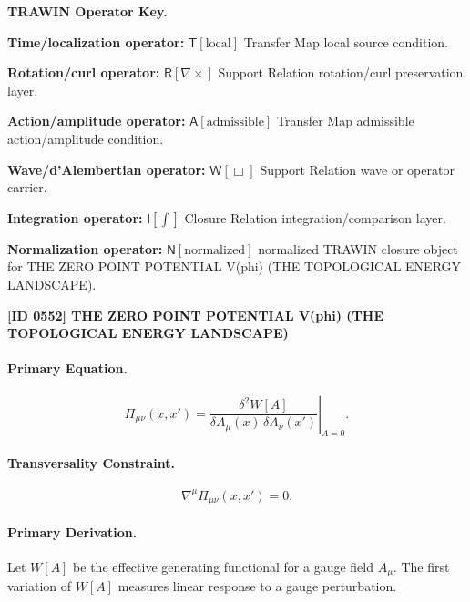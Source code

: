 \par\vspace{0.45\baselineskip}
\noindent\begin{minipage}[t]{\linewidth}
\begingroup
\small
\raggedright
\textbf{TRAWIN Operator Key.}\par
\noindent\textbf{Time/localization operator:} $\mathsf{T}\!\left[\mathrm{local}\right]$ Transfer Map local source condition.\par
\noindent\textbf{Rotation/curl operator:} $\mathsf{R}\!\left[\nabla\times\right]$ Support Relation rotation/curl preservation layer.\par
\noindent\textbf{Action/amplitude operator:} $\mathsf{A}\!\left[\mathrm{admissible}\right]$ Transfer Map admissible action/amplitude condition.\par
\noindent\textbf{Wave/d'Alembertian operator:} $\mathsf{W}\!\left[\Box\right]$ Support Relation wave or operator carrier.\par
\noindent\textbf{Integration operator:} $\mathsf{I}\!\left[\int\right]$ Closure Relation integration/comparison layer.\par
\noindent\textbf{Normalization operator:} $\mathsf{N}\!\left[\mathrm{normalized}\right]$ normalized TRAWIN closure object for THE ZERO POINT POTENTIAL V(phi) (THE TOPOLOGICAL ENERGY LANDSCAPE).\par
\endgroup
\end{minipage}

\clearpage
\noindent\textbf{[ID 0552] THE ZERO POINT POTENTIAL V(phi) (THE TOPOLOGICAL ENERGY LANDSCAPE)}\par
\vspace{0.35em}
\paragraph{Primary Equation.}
\begin{equation}
\Pi_{\mu\nu}(x,x')
=
\left.
\frac{\delta^2 W[A]}
{\delta A_\mu(x)\,\delta A_\nu(x')}
\right|_{A=0}.
\end{equation}

\paragraph{Transversality Constraint.}
\begin{equation}
\nabla^\mu \Pi_{\mu\nu}(x,x')=0 .
\end{equation}

\paragraph{Primary Derivation.}
Let $W[A]$ be the effective generating functional for a gauge field $A_\mu$.  
The first variation of $W[A]$ measures linear response to a gauge perturbation.

